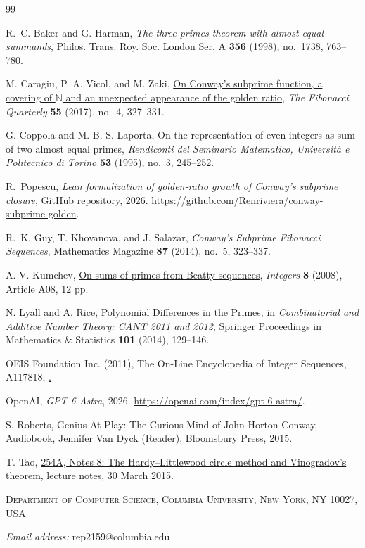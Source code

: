 \documentclass[11pt,letterpaper]{article}
\numberwithin{equation}{section}
\theoremstyle{remark}
\newcommand{\N}{\mathbb N}
\begin{document}
\begin{thebibliography}{99}

R.~C. Baker and G. Harman,
\emph{The three primes theorem with almost equal summands},
Philos. Trans. Roy. Soc. London Ser. A
\textbf{356} (1998), no.~1738, 763--780.

M. Caragiu, P. A. Vicol, and M. Zaki,
\href{https://www.fq.math.ca/Papers1/55-4/CaragiuVicolZaki03162017.pdf}
{On Conway's subprime function, a covering of $\N$ and an unexpected
appearance of the golden ratio},
\emph{The Fibonacci Quarterly} \textbf{55} (2017), no.~4, 327--331.

G. Coppola and M. B. S. Laporta,
{On the representation of even integers as sum of two almost equal primes},
\emph{Rendiconti del Seminario Matematico, Universit\`a e Politecnico
di Torino} \textbf{53} (1995), no.~3, 245--252.

R.~Popescu,
\emph{Lean formalization of golden-ratio growth of Conway's subprime closure},
GitHub repository, 2026.
\url{https://github.com/Renriviera/conway-subprime-golden}.

R.~K. Guy, T. Khovanova, and J. Salazar,
\emph{Conway's Subprime Fibonacci Sequences},
Mathematics Magazine \textbf{87} (2014), no.~5, 323--337.

A. V. Kumchev,
\href{https://tigerweb.towson.edu/akumchev/a23.pdf}
{On sums of primes from Beatty sequences},
\emph{Integers} \textbf{8} (2008), Article A08, 12 pp.


N. Lyall and A. Rice, 
{Polynomial Differences in the Primes}, in \emph{Combinatorial and Additive Number Theory: CANT 2011 and 2012}, 
Springer Proceedings in Mathematics \& Statistics \textbf{101} (2014), 129--146.


OEIS Foundation Inc. (2011), The On-Line Encyclopedia of Integer Sequences, A117818, \href{https://oeis.org/A117818}.

OpenAI, \emph{GPT-6 Astra},
2026. \url{https://openai.com/index/gpt-6-astra/}.

S. Roberts, 
{Genius At Play: The Curious Mind of John Horton Conway, Audiobook, Jennifer Van Dyck
(Reader)}, 
Bloomsbury Press, 2015.

T. Tao,
\href{https://terrytao.wordpress.com/2015/03/30/254a-notes-8-the-hardy-littlewood-circle-method-and-vinogradovs-theorem/}
{254A, Notes 8: The Hardy--Littlewood circle method and Vinogradov's theorem},
lecture notes, 30 March 2015.

\end{thebibliography}

\bigskip
\noindent
\begin{scriptsize}
\textsc{Department of Computer Science, Columbia University,
New York, NY 10027, USA}
%

\noindent
\textit{Email address:}  rep2159@columbia.edu
\end{scriptsize}
\end{document}
